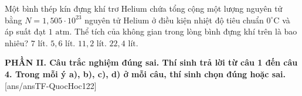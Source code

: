 \begin{ex}	Một bình thép kín đựng khí trơ Helium chứa tổng cộng một lượng nguyên tử bằng $N = 1,505 \cdot 10^{23}$ nguyên tử Helium ở điều kiện nhiệt độ tiêu chuẩn $0^\circ\text{C}$ và áp suất đạt $1\text{ atm}$. Thể tích của không gian trong lòng bình đựng khí trên là bao nhiêu?
	\choice
	{$7\text{ lít}$.}
	{\True $5,6\text{ lít}$.}
	{$11,2\text{ lít}$.}
	{$22,4\text{ lít}$.}
\end{ex}


\noindent \textbf{PHẦN II. Câu trắc nghiệm đúng sai. Thí sinh trả lời từ câu 1 đến câu 4. Trong mỗi ý a), b), c), d) ở mỗi câu, thí sinh chọn đúng hoặc sai.}
[ans/ansTF-QuocHoc122]

